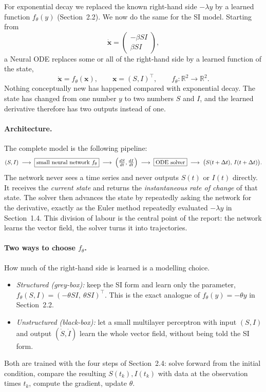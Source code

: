 \documentclass[11pt,a4paper]{article}
\begin{document}
For exponential decay we replaced the known right-hand side $-\lambda y$ by a
learned function $f_\theta(y)$ (Section~2.2). We now do the same for the SI
model. Starting from
\[
  \dot{\mathbf{x}} = \begin{pmatrix} -\beta SI \\ \beta SI \end{pmatrix},
\]
a Neural ODE replaces some or all of the right-hand side by a learned function
of the state,
\begin{equation}
  \dot{\mathbf{x}} = f_\theta(\mathbf{x}), \qquad \mathbf{x} = (S,I)^\top,
  \qquad f_\theta : \mathbb{R}^2 \to \mathbb{R}^2 .
  \label{eq:si-node}
\end{equation}
Nothing conceptually new has happened compared with exponential decay. The state
has changed from one number $y$ to two numbers $S$ and $I$, and the learned
derivative therefore has two outputs instead of one.

\paragraph{Architecture.}
The complete model is the following pipeline:
\[
  (S,I)\;\longrightarrow\;
  \boxed{\text{small neural network } f_\theta}\;\longrightarrow\;
  \Bigl(\tfrac{dS}{dt},\tfrac{dI}{dt}\Bigr)\;\longrightarrow\;
  \boxed{\text{ODE solver}}\;\longrightarrow\;
  \bigl(S(t+\Delta t),\, I(t+\Delta t)\bigr).
\]
The network never sees a time series and never outputs $S(t)$ or $I(t)$
directly. It receives the \emph{current state} and returns the
\emph{instantaneous rate of change} of that state. The solver then advances the
state by repeatedly asking the network for the derivative, exactly as the Euler
method repeatedly evaluated $-\lambda y$ in Section~1.4. This division of labour
is the central point of the report: the network learns the vector field, the
solver turns it into trajectories.

\paragraph{Two ways to choose $f_\theta$.}
How much of the right-hand side is learned is a modelling choice.
\begin{itemize}
  \item \emph{Structured (grey-box):} keep the SI form and learn only the
  parameter, $f_\theta(S,I) = (-\theta SI,\ \theta SI)^\top$. This is the exact
  analogue of $f_\theta(y) = -\theta y$ in Section~2.2.
  \item \emph{Unstructured (black-box):} let a small multilayer perceptron with
  input $(S,I)$ and output $(\dot S,\dot I)$ learn the whole vector field, without
  being told the SI form.
\end{itemize}
Both are trained with the four steps of Section~2.4: solve forward from the
initial condition, compare the resulting $S(t_k), I(t_k)$ with data at the
observation times $t_k$, compute the gradient, update $\theta$.
\end{document}

